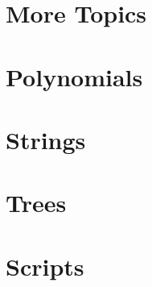   \section{More Topics}
  

  \section{Polynomials}
  

  \section{Strings}
  

  \section{Trees}
  

  \section{Scripts}
  


